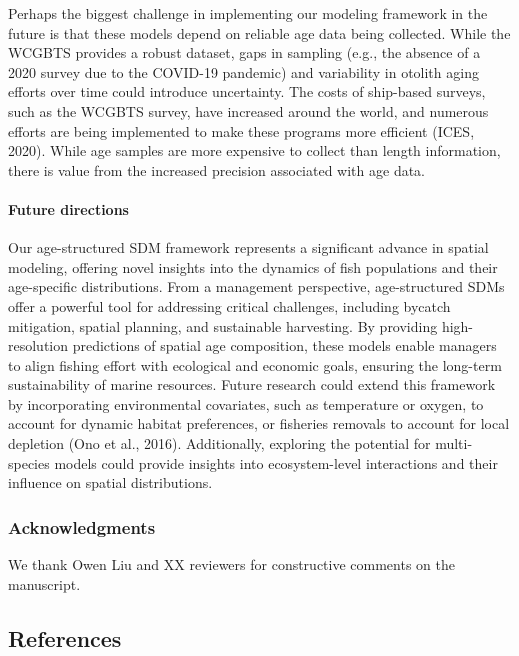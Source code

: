 \documentclass[
]{article}
\let\oldparagraph\paragraph
\renewcommand{\paragraph}[1]{\oldparagraph{#1}\mbox{}}
\begin{document}
Perhaps the biggest challenge in implementing our modeling framework in
the future is that these models depend on reliable age data being
collected. While the WCGBTS provides a robust dataset, gaps in sampling
(e.g., the absence of a 2020 survey due to the COVID-19 pandemic) and
variability in otolith aging efforts over time could introduce
uncertainty. The costs of ship-based surveys, such as the WCGBTS survey,
have increased around the world, and numerous efforts are being
implemented to make these programs more efficient (ICES, 2020). While
age samples are more expensive to collect than length information, there
is value from the increased precision associated with age data.

\hypertarget{future-directions}{%
\paragraph{Future directions}\label{future-directions}}

Our age-structured SDM framework represents a significant advance in
spatial modeling, offering novel insights into the dynamics of fish
populations and their age-specific distributions. From a management
perspective, age-structured SDMs offer a powerful tool for addressing
critical challenges, including bycatch mitigation, spatial planning, and
sustainable harvesting. By providing high-resolution predictions of
spatial age composition, these models enable managers to align fishing
effort with ecological and economic goals, ensuring the long-term
sustainability of marine resources. Future research could extend this
framework by incorporating environmental covariates, such as temperature
or oxygen, to account for dynamic habitat preferences, or fisheries
removals to account for local depletion (Ono et al., 2016).
Additionally, exploring the potential for multi-species models could
provide insights into ecosystem-level interactions and their influence
on spatial distributions.

\hypertarget{acknowledgments}{%
\subsubsection{Acknowledgments}\label{acknowledgments}}

We thank Owen Liu and XX reviewers for constructive comments on the
manuscript.

\break
\clearpage

\hypertarget{references}{%
\subsection{References}\label{references}}
\end{document}
